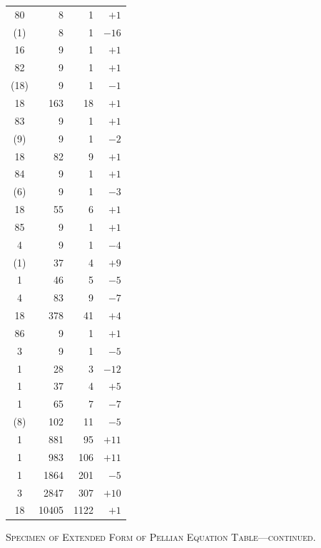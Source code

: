 \documentclass[11pt]{article}
\begin{document}
\begin{center}
\begin{tabular}{|c|r|r|r|}
\hline
80 & 8 & 1 & $+1$ \\
(1) & 8 & 1 & $-16$ \\
16 & 9 & 1 & $+1$ \\
\hline
82 & 9 & 1 & $+1$ \\
(18) & 9 & 1 & $-1$ \\
18 & 163 & 18 & $+1$ \\
\hline
83 & 9 & 1 & $+1$ \\
(9) & 9 & 1 & $-2$ \\
18 & 82 & 9 & $+1$ \\
\hline
84 & 9 & 1 & $+1$ \\
(6) & 9 & 1 & $-3$ \\
18 & 55 & 6 & $+1$ \\
\hline
85 & 9 & 1 & $+1$ \\
4 & 9 & 1 & $-4$ \\
(1) & 37 & 4 & $+9$ \\
1 & 46 & 5 & $-5$ \\
4 & 83 & 9 & $-7$ \\
18 & 378 & 41 & $+4$ \\
\hline
86 & 9 & 1 & $+1$ \\
3 & 9 & 1 & $-5$ \\
1 & 28 & 3 & $-12$ \\
1 & 37 & 4 & $+5$ \\
1 & 65 & 7 & $-7$ \\
(8) & 102 & 11 & $-5$ \\
1 & 881 & 95 & $+11$ \\
1 & 983 & 106 & $+11$ \\
1 & 1864 & 201 & $-5$ \\
3 & 2847 & 307 & $+10$ \\
18 & 10405 & 1122 & $+1$ \\
\hline
\end{tabular}
\end{center}

\begin{center}
\small\textsc{Specimen of Extended Form of Pellian Equation Table---continued.}
\end{center}
\end{document}
